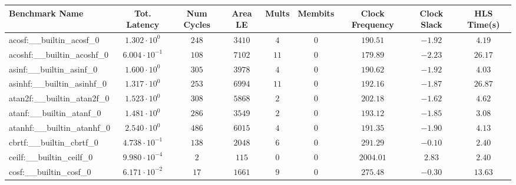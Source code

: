 \begin{tabular}{|l|c|c|c|c|c|c|c|c|}
\hline
Benchmark Name                            & Tot. Latency            & Num Cycles & Area LE    & Mults   & Membits & Clock Frequency & Clock Slack & HLS Time(s) \\
\hline
acosf:\_\_builtin\_acosf\_0               & $ 1.302 \cdot 10^{0}  $ & $ 248    $ & $ 3410   $ & $ 4   $ & $ 0   $ & $ 190.51      $ & $ -1.92   $ & $ 4.19    $ \\
acoshf:\_\_builtin\_acoshf\_0             & $ 6.004 \cdot 10^{-1} $ & $ 108    $ & $ 7102   $ & $ 11  $ & $ 0   $ & $ 179.89      $ & $ -2.23   $ & $ 26.17   $ \\
asinf:\_\_builtin\_asinf\_0               & $ 1.600 \cdot 10^{0}  $ & $ 305    $ & $ 3978   $ & $ 4   $ & $ 0   $ & $ 190.62      $ & $ -1.92   $ & $ 4.03    $ \\
asinhf:\_\_builtin\_asinhf\_0             & $ 1.317 \cdot 10^{0}  $ & $ 253    $ & $ 6994   $ & $ 11  $ & $ 0   $ & $ 192.16      $ & $ -1.87   $ & $ 26.87   $ \\
atan2f:\_\_builtin\_atan2f\_0             & $ 1.523 \cdot 10^{0}  $ & $ 308    $ & $ 5868   $ & $ 2   $ & $ 0   $ & $ 202.18      $ & $ -1.62   $ & $ 4.62    $ \\
atanf:\_\_builtin\_atanf\_0               & $ 1.481 \cdot 10^{0}  $ & $ 286    $ & $ 3549   $ & $ 2   $ & $ 0   $ & $ 193.12      $ & $ -1.85   $ & $ 3.08    $ \\
atanhf:\_\_builtin\_atanhf\_0             & $ 2.540 \cdot 10^{0}  $ & $ 486    $ & $ 6015   $ & $ 4   $ & $ 0   $ & $ 191.35      $ & $ -1.90   $ & $ 4.13    $ \\
cbrtf:\_\_builtin\_cbrtf\_0               & $ 4.738 \cdot 10^{-1} $ & $ 138    $ & $ 2048   $ & $ 6   $ & $ 0   $ & $ 291.29      $ & $ -0.10   $ & $ 2.40    $ \\
ceilf:\_\_builtin\_ceilf\_0               & $ 9.980 \cdot 10^{-4} $ & $ 2      $ & $ 115    $ & $ 0   $ & $ 0   $ & $ 2004.01     $ & $ 2.83    $ & $ 2.40    $ \\
cosf:\_\_builtin\_cosf\_0                 & $ 6.171 \cdot 10^{-2} $ & $ 17     $ & $ 1661   $ & $ 9   $ & $ 0   $ & $ 275.48      $ & $ -0.30   $ & $ 13.63   $ \\

\end{tabular}
